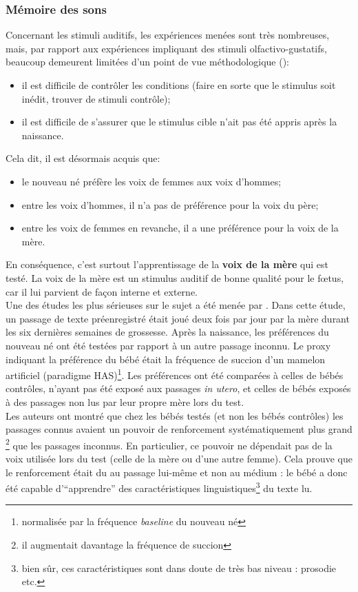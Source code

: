 \documentclass[french]{article}
\begin{document}
			\subsubsection{Mémoire des sons}
				Concernant les stimuli auditifs, les expériences menées sont très nombreuses, mais, par rapport aux expériences impliquant des stimuli olfactivo-gustatifs, beaucoup demeurent limitées d'un point de vue méthodologique (\cite{james2010}):
				\begin{itemize}
					\item il est difficile de contrôler les conditions (faire en sorte que le stimulus soit inédit, trouver de stimuli contrôle);
					\item  il est difficile de s'assurer que le stimulus cible n'ait pas été appris après la naissance.
				\end{itemize}\vspace{2mm}
				Cela dit, il est désormais acquis que:
				\begin{itemize}
					\item le nouveau né préfère les voix de femmes aux voix d'hommes;
					\item entre les voix d'hommes, il n'a pas de préférence pour la voix du père;
					\item entre les voix de femmes en revanche, il a une préférence pour la voix de la mère.
				\end{itemize}\vspace{2mm}
				En conséquence, c'est surtout l'apprentissage de la \textbf{voix de la mère} qui est testé. La voix de la mère est un stimulus auditif de bonne qualité pour le fœtus, car il lui parvient de façon interne et externe.\\
				
				Une des études les plus sérieuses sur le sujet a été menée par \cite{deCasper1986}. Dans cette étude, un passage de texte préenregistré était joué deux fois par jour par la mère durant les six dernières semaines de grossesse. Après la naissance, les préférences du nouveau né ont été testées par rapport à un autre passage inconnu. Le proxy indiquant la préférence du bébé était la fréquence de succion d'un mamelon artificiel (paradigme HAS)\footnote{normalisée par la fréquence \textit{baseline} du nouveau né}. Les préférences ont été comparées à celles de bébés contrôles, n'ayant pas été exposé aux passages \textit{in utero}, et celles de bébés exposés à des passages non lus par leur propre mère lors du test.\\
				Les auteurs ont montré que chez les bébés testés (et non les bébés contrôles) les passages connus avaient un pouvoir de renforcement systématiquement plus grand \footnote{il augmentait davantage la fréquence de succion} que les passages inconnus. En particulier, ce pouvoir ne dépendait pas de la voix utilisée lors du test (celle de la mère ou d'une autre femme). Cela prouve que le renforcement était du au passage lui-même et non au médium : le bébé a donc été capable d'``apprendre'' des caractéristiques linguistiques\footnote{bien sûr, ces caractéristiques sont dans doute de très bas niveau : prosodie etc.} du texte lu.\\
				
\end{document}
